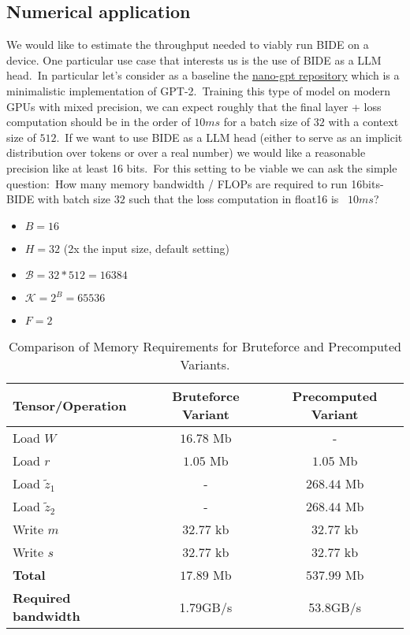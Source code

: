 \documentclass{article}
\begin{document}
\subsection{Numerical application}
We would like to estimate the throughput needed to viably run BIDE on a device. One particular use case that interests us is the use of BIDE as a LLM head.\
In particular let's consider as a baseline the \href{https://github.com/karpathy/nanoGPT}{nano-gpt repository} which is a minimalistic implementation of GPT-2.\
Training this type of model on modern GPUs with mixed precision, we can expect roughly that the final layer + loss computation should be in the order of $10ms$ for a batch size of $32$ with a context size of $512$.\
If we want to use BIDE as a LLM head (either to serve as an implicit distribution over tokens or over a real number) we would like a reasonable precision like at least 16 bits.\
For this setting to be viable we can ask the simple question:\
How many memory bandwidth / FLOPs are required to run 16bits-BIDE with batch size $32$ such that the loss computation in float16 is ~$10ms$?
\begin{itemize}
    \item $B=16$
    \item $H=32$ (2x the input size, default setting)
    \item $\mathcal{B}=32*512=16384$
    \item $\mathcal{K}=2^B=65536$
    \item $F=2$
\end{itemize}

\begin{table}[ht]
\centering
\begin{tabular}{|l|c|c|}
\hline
\textbf{Tensor/Operation} & \textbf{Bruteforce Variant} & \textbf{Precomputed Variant} \\ \hline
Load $W$ & $16.78$ Mb & - \\ \hline
Load $r$ & $1.05$ Mb & $1.05$ Mb \\ \hline
Load $\tilde{z}_1$ & - & $268.44$ Mb \\ \hline
Load $\tilde{z}_2$ & - & $268.44$ Mb \\ \hline
Write $m$ & $32.77$ kb & $32.77$ kb \\ \hline
Write $s$ & $32.77$ kb & $32.77$ kb \\ \hline
\textbf{Total} & $17.89$ Mb & $537.99$ Mb \\ \hline
\textbf{Required bandwidth} & 1.79GB/s & 53.8GB/s \\ \hline
\end{tabular}
\caption{Comparison of Memory Requirements for Bruteforce and Precomputed Variants.}
\label{table:variants-comparison}
\end{table}
\end{document}
